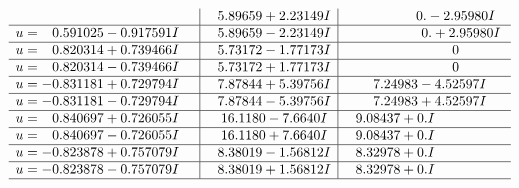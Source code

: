 \documentclass[1p]{elsarticle_modified}
\theoremstyle{definition}
\begin{document}
$$\begin{array}{c|c|c}
 & \phantom{-}5.89659 + 2.23149 I & \phantom{-0.000000 } 0. - 2.95980 I \\ \hline\begin{aligned}
u &= \phantom{-}0.591025 - 0.917591 I\end{aligned}
 & \phantom{-}5.89659 - 2.23149 I & \phantom{-0.000000 -}0. + 2.95980 I \\ \hline\begin{aligned}
u &= \phantom{-}0.820314 + 0.739466 I\end{aligned}
 & \phantom{-}5.73172 - 1.77173 I & \phantom{-0.000000 } 0 \\ \hline\begin{aligned}
u &= \phantom{-}0.820314 - 0.739466 I\end{aligned}
 & \phantom{-}5.73172 + 1.77173 I & \phantom{-0.000000 } 0 \\ \hline\begin{aligned}
u &= -0.831181 + 0.729794 I\end{aligned}
 & \phantom{-}7.87844 + 5.39756 I & \phantom{-}7.24983 - 4.52597 I \\ \hline\begin{aligned}
u &= -0.831181 - 0.729794 I\end{aligned}
 & \phantom{-}7.87844 - 5.39756 I & \phantom{-}7.24983 + 4.52597 I \\ \hline\begin{aligned}
u &= \phantom{-}0.840697 + 0.726055 I\end{aligned}
 & \phantom{-}16.1180 - 7.6640 I & \phantom{-}9.08437 + 0. I\phantom{ +0.000000I} \\ \hline\begin{aligned}
u &= \phantom{-}0.840697 - 0.726055 I\end{aligned}
 & \phantom{-}16.1180 + 7.6640 I & \phantom{-}9.08437 + 0. I\phantom{ +0.000000I} \\ \hline\begin{aligned}
u &= -0.823878 + 0.757079 I\end{aligned}
 & \phantom{-}8.38019 - 1.56812 I & \phantom{-}8.32978 + 0. I\phantom{ +0.000000I} \\ \hline\begin{aligned}
u &= -0.823878 - 0.757079 I\end{aligned}
 & \phantom{-}8.38019 + 1.56812 I & \phantom{-}8.32978 + 0. I\phantom{ +0.000000I}\\
 \hline 
 \end{array}$$\newpage$$\begin{array}{c|c|c}  

\end{array}$$
\end{document}
